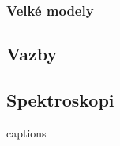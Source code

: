 \documentclass[
  digital, %
  table,   %
  lof,     %
  lot,     %
]{fithesis3}
\begin{document}
\subsubsection{Velké modely}




\subsection{Vazby}

\subsection{Spektroskopi}














{\csname captions\languagename\endcsname %
\makeatletter %
  \thesis@selectLocale{\thesis@locale}\makeatother
\printbibliography[heading=bibintoc]} %
\appendix %
\end{document}
